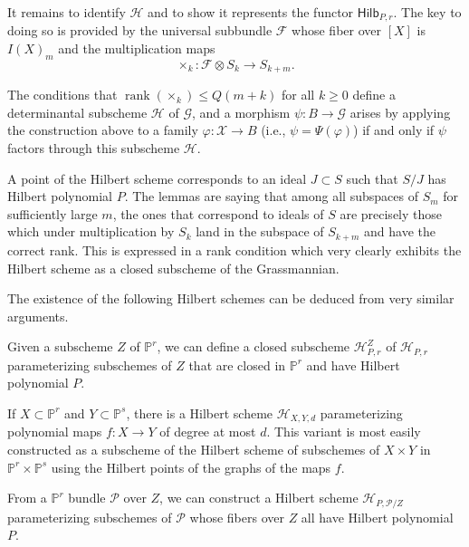 \documentclass[12pt]{article}
\begin{document}
It remains to identify $\mathcal{H}$ and to show it represents the functor $\mathsf{Hilb}_{P,r}$. The key to doing so is provided by the universal subbundle $\mathcal{F}$ whose fiber over $[X]$ is $I(X)_m$ and the multiplication maps
\[
    \times_k : \mathcal{F} \otimes S_k \to S_{k+m}.
\]

\begin{lemma}
    The conditions that $\operatorname{rank}(\times_k) \leq Q(m+k)$ for all $k \geq 0$ define a determinantal subscheme $\mathcal{H}$ of $\mathcal{G}$, and a morphism $\psi : B \to \mathcal{G}$ arises by applying the construction above to a family $\varphi : \mathcal{X} \to B$ (i.e., $\psi = \Psi(\varphi)$) if and only if $\psi$ factors through this subscheme $\mathcal{H}$.
\end{lemma}

\begin{remark}
    A point of the Hilbert scheme corresponds to an ideal $J \subset S$ such that $S/J$ has Hilbert polynomial $P$. The lemmas are saying that among all subspaces of $S_m$ for sufficiently large $m$, the ones that correspond to ideals of $S$ are precisely those which under multiplication by $S_k$ land in the subspace of $S_{k+m}$ and have the correct rank. This is expressed in a rank condition which very clearly exhibits the Hilbert scheme as a closed subscheme of the Grassmannian.
\end{remark}
The existence of the following Hilbert schemes can be deduced from very similar arguments.

\begin{definition}
    Given a subscheme $Z$ of $\mathbb{P}^r$, we can define a closed subscheme $\mathcal{H}^Z_{P,r}$ of $\mathcal{H}_{P,r}$ parameterizing subschemes of $Z$ that are closed in $\mathbb{P}^r$ and have Hilbert polynomial $P$.
\end{definition}

\begin{definition}
    If $X \subset \mathbb{P}^r$ and $Y \subset \mathbb{P}^s$, there is a Hilbert scheme $\mathcal{H}_{X,Y,d}$ parameterizing polynomial maps $f : X \to Y$ of degree at most $d$. This variant is most easily constructed as a subscheme of the Hilbert scheme of subschemes of $X \times Y$ in $\mathbb{P}^r \times \mathbb{P}^s$ using the Hilbert points of the graphs of the maps $f$.
\end{definition}

\begin{definition}
    From a $\mathbb{P}^r$ bundle $\mathcal{P}$ over $Z$, we can construct a Hilbert scheme $\mathcal{H}_{P,\mathcal{P}/Z}$ parameterizing subschemes of $\mathcal{P}$ whose fibers over $Z$ all have Hilbert polynomial $P$.
\end{definition}
\end{document}
